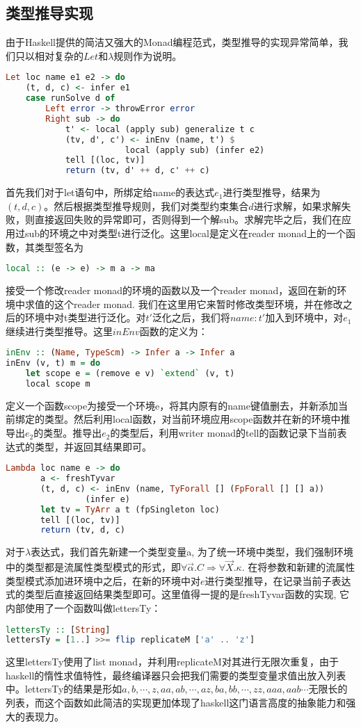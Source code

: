 \documentclass[12pt, titlepage]{article}
\begin{document}
	\subsection{类型推导实现}
	由于Haskell提供的简洁又强大的Monad编程范式，类型推导的实现异常简单，我们只以相对复杂的$Let$和$\lambda$规则作为说明。
	\begin{lstlisting}[language=haskell]
Let loc name e1 e2 -> do
    (t, d, c) <- infer e1
    case runSolve d of
        Left error -> throwError error
        Right sub -> do
            t' <- local (apply sub) generalize t c
            (tv, d', c') <- inEnv (name, t') $ 
            			local (apply sub) (infer e2)
            tell [(loc, tv)]
            return (tv, d' ++ d, c' ++ c)
	\end{lstlisting}
	首先我们对于let语句中，所绑定给name的表达式$e_1$进行类型推导，结果为$(t, d, c)$。然后根据类型推导规则，我们对类型约束集合$d$进行求解，如果求解失败，则直接返回失败的异常即可，否则得到一个解sub。求解完毕之后，我们在应用过sub的环境之中对类型t进行泛化。这里local是定义在reader monad上的一个函数，其类型签名为
	\begin{lstlisting}[language=haskell]
local :: (e -> e) -> m a -> ma
	\end{lstlisting}
	接受一个修改reader monad的环境的函数以及一个reader monad，返回在新的环境中求值的这个reader monad. 我们在这里用它来暂时修改类型环境，并在修改之后的环境中对t类型进行泛化。对$t'$泛化之后，我们将$name:t'$加入到环境中，对$e_1$继续进行类型推导。这里$inEnv$函数的定义为：
	\begin{lstlisting}[language=haskell]
inEnv :: (Name, TypeScm) -> Infer a -> Infer a
inEnv (v, t) m = do
    let scope e = (remove e v) `extend` (v, t) 
    local scope m
	\end{lstlisting}
	定义一个函数scope为接受一个环境e，将其内原有的name键值删去，并新添加当前绑定的类型。然后利用local函数，对当前环境应用scope函数并在新的环境中推导出$e_2$的类型。推导出$e_2$的类型后，利用writer monad的tell的函数记录下当前表达式的类型，并返回其结果即可。
	\begin{lstlisting}[language=haskell]
Lambda loc name e -> do 
       a <- freshTyvar
       (t, d, c) <- inEnv (name, TyForall [] (FpForall [] [] a)) 
       			(infer e)
       let tv = TyArr a t (fpSingleton loc)
       tell [(loc, tv)]
       return (tv, d, c)
	\end{lstlisting}
	对于$\lambda$表达式，我们首先新建一个类型变量a, 为了统一环境中类型，我们强制环境中的类型都是流属性类型模式的形式，即$\forall\vec{\alpha}.C\Rightarrow\forall\vec{X}.\kappa$. 在将参数和新建的流属性类型模式添加进环境中之后，在新的环境中对$e$进行类型推导，在记录当前子表达式的类型后直接返回结果类型即可。这里值得一提的是freshTyvar函数的实现, 它内部使用了一个函数叫做lettersTy：
	\begin{lstlisting}[language=haskell]
lettersTy :: [String]
lettersTy = [1..] >>= flip replicateM ['a' .. 'z']
	\end{lstlisting}
	这里lettersTy使用了list monad，并利用replicateM对其进行无限次重复，由于haskell的惰性求值特性，最终编译器只会把我们需要的类型变量求值出放入列表中。lettersTy的结果是形如${a, b, \cdots, z, aa, ab, \cdots, az, ba, bb, \cdots, zz, aaa, aab\cdots}$无限长的列表，而这个函数如此简洁的实现更加体现了haskell这门语言高度的抽象能力和强大的表现力。
\end{document}
